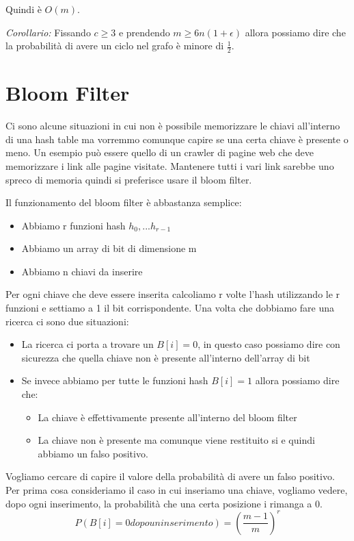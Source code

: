 \documentclass[14pt]{extreport}
\begin{document}
Quindi è $O(m)$.

\textit{Corollario:} Fissando $c\geq3$ e prendendo $m\geq6n(1+\epsilon)$ allora possiamo dire che la probabilità di avere un ciclo nel grafo è minore di $\frac{1}{2}$.


\section{Bloom Filter}

Ci sono alcune situazioni in cui non è possibile memorizzare le chiavi all'interno di una hash table ma vorremmo comunque capire se una certa chiave è presente o meno. Un esempio può essere quello di un crawler di pagine web che deve memorizzare i link alle pagine visitate. Mantenere tutti i vari link sarebbe uno spreco di memoria quindi si preferisce usare il bloom filter.

Il funzionamento del bloom filter è abbastanza semplice:
\begin{itemize}
\item Abbiamo r funzioni hash $h_0,...h_{r-1}$
\item Abbiamo un array di bit di dimensione m
\item Abbiamo n chiavi da inserire
\end{itemize}

Per ogni chiave che deve essere inserita calcoliamo r volte l'hash utilizzando le r funzioni e settiamo a 1 il bit corrispondente.
Una volta che dobbiamo fare una ricerca ci sono due situazioni:
\begin{itemize}
\item La ricerca ci porta a trovare un $B[i]=0$, in questo caso possiamo dire con sicurezza che quella chiave non è presente all'interno dell'array di bit
\item Se invece abbiamo per tutte le funzioni hash $B[i]=1$ allora possiamo dire che:
\begin{itemize}
\item La chiave è effettivamente presente all'interno del bloom filter
\item La chiave non è presente ma comunque viene restituito si e quindi abbiamo un falso positivo.
\end{itemize}
\end{itemize}

Vogliamo cercare di capire il valore della probabilità di avere un falso positivo.
Per prima cosa consideriamo il caso in cui inseriamo una chiave, vogliamo vedere, dopo ogni inserimento, la probabilità che una certa posizione i rimanga a 0.
\begin{equation}
P(B[i]=0 dopo un inserimento) = (\frac{m-1}{m})^r
\end{equation}
\end{document}
